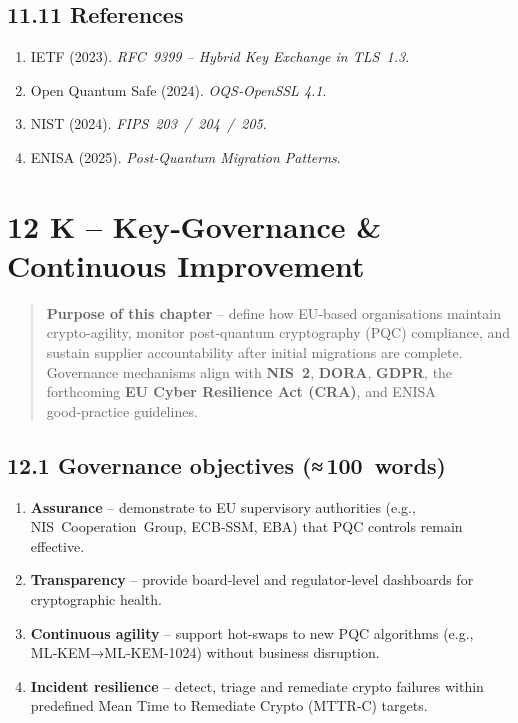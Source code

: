 \documentclass[
  english,
]{article}
\providecommand{\tightlist}{%
  \setlength{\itemsep}{0pt}\setlength{\parskip}{0pt}}
\begin{document}
\subsection{11.11 References}\label{references-3}

\begin{enumerate}
\def\labelenumi{\arabic{enumi}.}
\tightlist
\item
  IETF (2023). \emph{RFC~9399 -- Hybrid Key Exchange in TLS~1.3}.
\item
  Open Quantum Safe (2024). \emph{OQS‑OpenSSL 4.1}.
\item
  NIST (2024). \emph{FIPS~203~/~204~/~205}.
\item
  ENISA (2025). \emph{Post‑Quantum Migration Patterns}.
\end{enumerate}

\section{12 K -- Key‑Governance \& Continuous
Improvement}\label{k-keygovernance-continuous-improvement-1}

\begin{quote}
\textbf{Purpose of this chapter} -- define how EU‑based organisations
maintain crypto‑agility, monitor post‑quantum cryptography (PQC)
compliance, and sustain supplier accountability after initial migrations
are complete. Governance mechanisms align with \textbf{NIS~2},
\textbf{DORA}, \textbf{GDPR}, the forthcoming \textbf{EU Cyber
Resilience Act (CRA)}, and ENISA good‑practice guidelines.
\end{quote}

\subsection{12.1 Governance objectives
(≈\,100~words)}\label{governance-objectives-100-words}

\begin{enumerate}
\def\labelenumi{\arabic{enumi}.}
\tightlist
\item
  \textbf{Assurance} -- demonstrate to EU supervisory authorities (e.g.,
  NIS~Cooperation~Group, ECB‑SSM, EBA) that PQC controls remain
  effective.
\item
  \textbf{Transparency} -- provide board‑level and regulator‑level
  dashboards for cryptographic health.
\item
  \textbf{Continuous agility} -- support hot‑swaps to new PQC algorithms
  (e.g., ML‑KEM→ML‑KEM‑1024) without business disruption.
\item
  \textbf{Incident resilience} -- detect, triage and remediate crypto
  failures within predefined Mean Time to Remediate Crypto (MTTR‑C)
  targets.
\end{enumerate}
\end{document}
